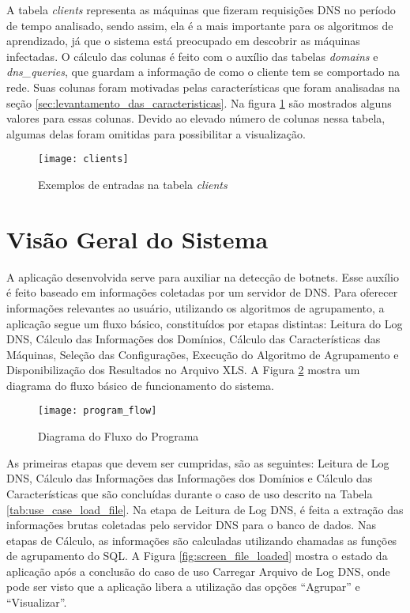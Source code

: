A tabela \textit{clients} representa as máquinas que fizeram requisições DNS no período de tempo analisado, sendo assim, ela é a mais importante para os algoritmos de aprendizado, já que o sistema está preocupado em descobrir as máquinas infectadas. O cálculo das colunas é feito com o auxílio das tabelas \textit{domains} e \textit{dns\_queries}, que guardam a informação de como o cliente tem se comportado na rede. Suas colunas foram motivadas pelas características que foram analisadas na seção \ref{sec:levantamento_das_caracteristicas}. Na figura \ref{fig:clients} são mostrados alguns valores para essas colunas. Devido ao elevado número de colunas nessa tabela, algumas delas foram omitidas para possibilitar a visualização.

\begin{figure}
\texttt{[image: clients]}
\caption[Exemplos de entradas na tabela \textit{clients}]{Exemplos de entradas na tabela \textit{clients}} \label{fig:clients}
\end{figure}

\section{Visão Geral do Sistema}
A aplicação desenvolvida serve para auxiliar na detecção de botnets. Esse auxílio é feito baseado em informações coletadas por um servidor de DNS. Para oferecer informações relevantes ao usuário, utilizando os algoritmos de agrupamento, a aplicação segue um fluxo básico, constituídos por etapas distintas: Leitura do Log DNS, Cálculo das Informações dos Domínios, Cálculo das Características das Máquinas, Seleção das Configurações, Execução do Algoritmo de Agrupamento e Disponibilização dos Resultados no Arquivo XLS. A Figura \ref{fig:program_flow} mostra um diagrama do fluxo básico de funcionamento do sistema.

\begin{figure}
\centering
\texttt{[image: program\_flow]}
\caption[Diagram do Fluxo do Programa]{Diagrama do Fluxo do Programa} \label{fig:program_flow}
\end{figure}

As primeiras etapas que devem ser cumpridas, são as seguintes: Leitura de Log DNS, Cálculo das Informações das Informações dos Domínios e Cálculo das Características que são concluídas durante o caso de uso descrito na Tabela \ref{tab:use_case_load_file}. Na etapa de Leitura de Log DNS, é feita a extração das informações brutas coletadas pelo servidor DNS para o banco de dados. Nas etapas de Cálculo, as informações são calculadas utilizando chamadas as funções de agrupamento do SQL. A Figura \ref{fig:screen_file_loaded} mostra o estado da aplicação após a conclusão do caso de uso Carregar Arquivo de Log DNS, onde pode ser visto que a aplicação libera a utilização das opções ``Agrupar'' e ``Visualizar''.

